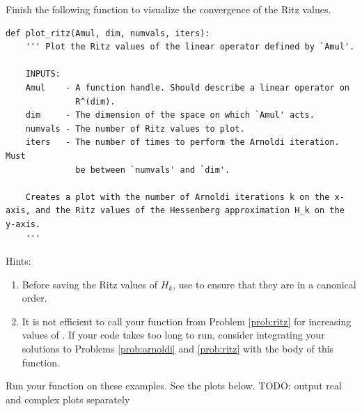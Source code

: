 \begin{problem}
Finish the following function to visualize the convergence of the Ritz values.
\begin{lstlisting}
def plot_ritz(Amul, dim, numvals, iters):
    ''' Plot the Ritz values of the linear operator defined by `Amul'.
    
    INPUTS:
    Amul    - A function handle. Should describe a linear operator on 
              R^(dim).
    dim     - The dimension of the space on which `Amul' acts.
    numvals - The number of Ritz values to plot.
    iters   - The number of times to perform the Arnoldi iteration. Must 
              be between `numvals' and `dim'.
    
    Creates a plot with the number of Arnoldi iterations k on the x-axis, and the Ritz values of the Hessenberg approximation H_k on the y-axis.
    '''
    \end{lstlisting}
Hints:
\begin{enumerate}
\item Before saving the Ritz values of $H_k$, use  to ensure that they are in a canonical order.
\item It is not efficient to call your function from Problem \ref{prob:ritz} for increasing values of . If your code takes too long to run, consider integrating your solutions to Problems \ref{prob:arnoldi} and \ref{prob:ritz} with the body of this function.
\end{enumerate}
Run your function on these examples. See the plots below.
TODO: output real and complex plots separately
\end{problem}



